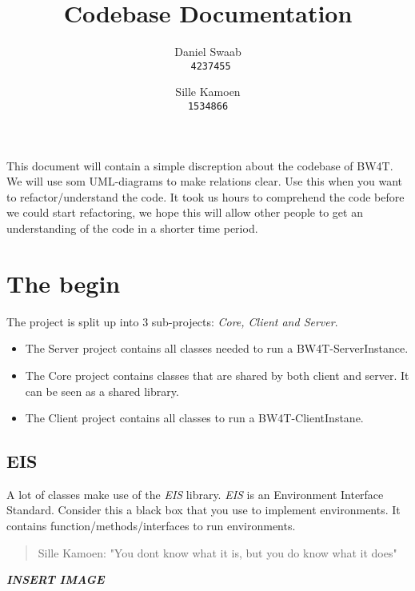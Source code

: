 \documentclass{article}
\begin{document}
\title{Codebase Documentation}
\author{Daniel Swaab\\
\texttt{ 4237455}
\and
Sille Kamoen \\
\texttt{1534866}
}
\maketitle

This document will contain a simple discreption about the codebase of BW4T. We will use som UML-diagrams to make relations clear. Use this when you want to refactor/understand the code. It took us hours to comprehend the code before we could start refactoring, we hope this will allow other people to get an understanding of the code in a shorter time period. 

\section*{The begin}
The project is split up into 3 sub-projects: \emph{Core, Client and Server}.
\begin{itemize}
	\item The Server project contains all classes needed to run a BW4T-ServerInstance.
	\item The Core project contains classes that are shared by both client and server. It can be seen as a shared library.
	\item The Client project contains all classes to run a BW4T-ClientInstane. 

\end{itemize}  
	
	\subsection*{EIS}
	A lot of classes make use of the \emph{EIS} library. \emph{EIS} is an Environment Interface Standard. Consider this a black box that you use to implement environments. It contains function/methods/interfaces to run environments. %
	\begin{quote}
		Sille Kamoen: "You dont know what it is, but you do know what it does" 
	\end{quote}
\textbf{\emph{INSERT IMAGE}}	 




\end{document}

